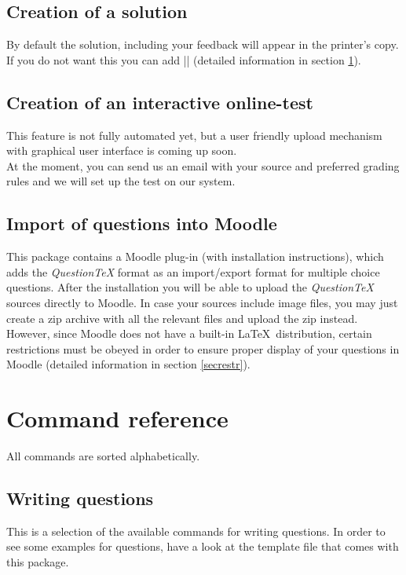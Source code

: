 \documentclass[a4paper,10pt]{ltxdoc}
\begin{document}
\subsection{Creation of a solution}
By default the solution, including your feedback
will appear in the printer's copy. If you do not want this
you can add |\hidesolution| (detailed information in section \ref{seccommand}).

\subsection{Creation of an interactive online-test}
This feature is not fully automated yet, but a user friendly upload mechanism
with graphical user interface is coming up soon.\\ At the moment, you can send
us an email with your source and preferred grading rules and we will set up the
test on our system.

\subsection{Import of questions into Moodle}
This package contains a Moodle plug-in (with installation instructions), which
adds the \emph{QuestionTeX} format as an import/export format for  multiple
choice questions. After the installation you will be able to upload the
\emph{QuestionTeX} sources directly to Moodle. In case your sources include
image files, you may just create a zip archive with all the relevant
files and upload the zip instead.\\
However, since Moodle does not have a built-in \LaTeX\ distribution, certain
restrictions must be obeyed in order to ensure proper display of your questions
in Moodle (detailed information in section \ref{secrestr}).




\section{Command reference}\label{seccommand}
All commands are sorted alphabetically.

\subsection{Writing questions}
This is a selection of the available commands for writing questions. In
order to see some examples for questions, have a look at the template file that
comes with this package.
\end{document}
